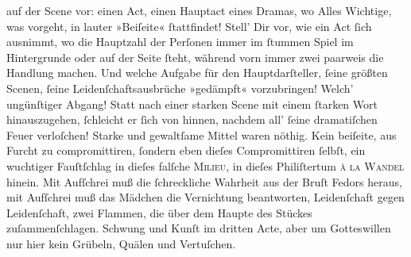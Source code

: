 \begin{ledgroupsized}[t]{13cm}
               auf der Scene vor: einen Act, einen Hauptact eines Dramas, wo Alles Wichtige, was
               vorgeht, in lauter »Beiſeite« ſtattfindet! Stell’ Dir vor, wie ein Act ſich ausnimmt,
               wo  die Haupt\strikeout{\textcolor{gray}{h}}zahl der Perſonen immer im ſtummen Spiel im Hintergrunde oder auf der Seite
               ſteht, während vorn immer zwei paarweis {\pb}die
               Handlung machen. Und welche Aufgabe für den Hauptdarſteller, ſeine größten Scenen,
               ſeine Leidenſchaftsausbrüche »gedämpft« vorzubringen! Welch’ ungünſtiger Abgang!
               Statt nach einer starken Scene mit einem ſtarken Wort hinauszugehen, ſchleicht er
               ſich von hinnen, nachdem all’ ſeine dramatiſchen Feuer verloſchen! Starke und
               gewaltſame Mittel waren nöthig. Kein beiſeite, aus Furcht zu compromittiren, ſondern
               eben dieſes Compromittiren ſelbſt, ein wuchtiger Fauſtſchlag \strikeout{\textcolor{gray}{×}\-\textcolor{gray}{×}\-\textcolor{gray}{×}} in dieſes falſche \textsc{Milieu}, in dieſes Philiſtertum \textsc{à la Wandel} hinein. Mit Aufſchrei muß die ſchreckliche Wahrheit aus der Bruſt Fedors heraus, mit Aufſchrei
               muß das Mädchen die Vernichtung beantworten, Leidenſchaft gegen Leidenſchaft, zwei
               Flammen, die über dem Haupte des Stückes zuſammenſchlagen. Schwung und Kunſt im dritten Acte, aber {\pb}um Gotteswillen nur hier kein Grübeln, Quälen und Vertuſchen.\pend
           \pstart

\end{ledgroupsized}
